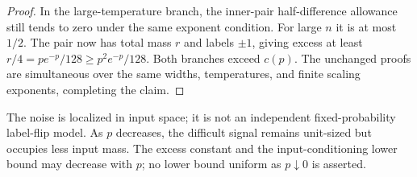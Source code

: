\begin{proof}
In the large-temperature branch, the inner-pair half-difference allowance still tends to zero under the same exponent condition. For large $n$ it is at most $1/2$. The pair now has total mass $r$ and labels $\pm1$, giving excess at least $r/4=pe^{-p}/128\ge p^2e^{-p}/128$. Both branches exceed $c(p)$. The unchanged proofs are simultaneous over the same widths, temperatures, and finite scaling exponents, completing the claim.
\end{proof}
The noise is localized in input space; it is not an independent fixed-probability label-flip model. As $p$ decreases, the difficult signal remains unit-sized but occupies less input mass. The excess constant and the input-conditioning lower bound may decrease with $p$; no lower bound uniform as $p\downarrow0$ is asserted.
